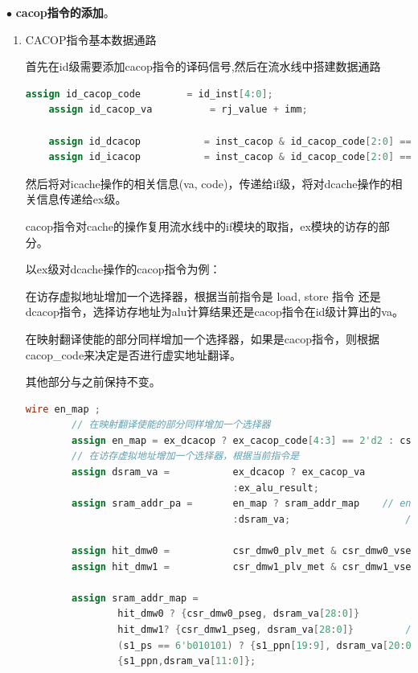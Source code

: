 \documentclass[11pt]{article}
\begin{document}
\noindent
$\bullet$
\textbf{cacop指令的添加}。
\begin{enumerate}
    \item CACOP指令基本数据通路
    
    首先在id级需要添加cacop指令的译码信号,然后在流水线中搭建数据通路
    \begin{lstlisting}[language=verilog]
    assign id_cacop_code        = id_inst[4:0];
    assign id_cacop_va          = rj_value + imm;

    assign id_dcacop           = inst_cacop & id_cacop_code[2:0] == 3'd1;
    assign id_icacop           = inst_cacop & id_cacop_code[2:0] == 3'd0;
    \end{lstlisting}

    然后将对icache操作的相关信息(va, code)，传递给if级，将对dcache操作的相关信息传递给ex级。
    
    cacop指令对cache的操作复用流水线中的if模块的取指，ex模块的访存的部分。

    以ex级对dcache操作的cacop指令为例：

    在访存虚拟地址增加一个选择器，根据当前指令是 load, store 指令 还是 dcacop指令，选择访存地址为alu计算结果还是cacop指令在id级计算出的va。

    在映射翻译使能的部分同样增加一个选择器，如果是cacop指令，则根据cacop\_code来决定是否进行虚实地址翻译。

    其他部分与之前保持不变。
    \begin{lstlisting}[language=verilog]
        wire en_map ;
        // 在映射翻译使能的部分同样增加一个选择器
        assign en_map = ex_dcacop ? ex_cacop_code[4:3] == 2'd2 : csr_crmd_pg; 
        // 在访存虚拟地址增加一个选择器，根据当前指令是
        assign dsram_va =           ex_dcacop ? ex_cacop_va       
                                    :ex_alu_result;
        assign sram_addr_pa =       en_map ? sram_addr_map    // enable mapping
                                    :dsram_va;                    // direct translate
                                
        assign hit_dmw0 =           csr_dmw0_plv_met & csr_dmw0_vseg == dsram_va[31:29];
        assign hit_dmw1 =           csr_dmw1_plv_met & csr_dmw1_vseg == dsram_va[31:29];
    
        assign sram_addr_map =
                hit_dmw0 ? {csr_dmw0_pseg, dsram_va[28:0]}         // dierct map windows 0
                hit_dmw1? {csr_dmw1_pseg, dsram_va[28:0]}         // direct map windows 1
                (s1_ps == 6'b010101) ? {s1_ppn[19:9], dsram_va[20:0]}   // tlb map: ps 4Mb
                {s1_ppn,dsram_va[11:0]};                             // tlb map : ps 4kb    
    \end{lstlisting}



\end{enumerate}
\end{document}
